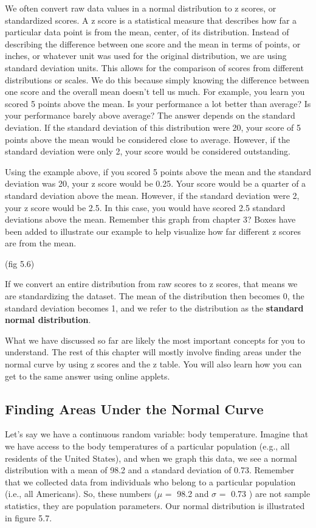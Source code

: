 \documentclass[
  letterpaper,
  DIV=11,
  numbers=noendperiod]{scrreprt}
\begin{document}
We often convert raw data values in a normal distribution to z scores,
or standardized scores. A z score is a statistical measure that
describes how far a particular data point is from the mean, center, of
its distribution. Instead of describing the difference between one score
and the mean in terms of points, or inches, or whatever unit was used
for the original distribution, we are using standard deviation units.
This allows for the comparison of scores from different distributions or
scales. We do this because simply knowing the difference between one
score and the overall mean doesn't tell us much. For example, you learn
you scored 5 points above the mean. Is your performance a lot better
than average? Is your performance barely above average? The answer
depends on the standard deviation. If the standard deviation of this
distribution were 20, your score of 5 points above the mean would be
considered close to average. However, if the standard deviation were
only 2, your score would be considered outstanding.

Using the example above, if you scored 5 points above the mean and the
standard deviation was 20, your z score would be 0.25. Your score would
be a quarter of a standard deviation above the mean. However, if the
standard deviation were 2, your z score would be 2.5. In this case, you
would have scored 2.5 standard deviations above the mean. Remember this
graph from chapter 3? Boxes have been added to illustrate our example to
help visualize how far different z scores are from the mean.

(fig 5.6)

If we convert an entire distribution from raw scores to z scores, that
means we are standardizing the dataset. The mean of the distribution
then becomes 0, the standard deviation becomes 1, and we refer to the
distribution as the \textbf{standard normal distribution}.

What we have discussed so far are likely the most important concepts for
you to understand. The rest of this chapter will mostly involve finding
areas under the normal curve by using z scores and the z table. You will
also learn how you can get to the same answer using online applets.

\subsection{Finding Areas Under the Normal
Curve}\label{finding-areas-under-the-normal-curve}

Let's say we have a continuous random variable: body temperature.
Imagine that we have access to the body temperatures of a particular
population (e.g., all residents of the United States), and when we graph
this data, we see a normal distribution with a mean of 98.2 and a
standard deviation of 0.73. Remember that we collected data from
individuals who belong to a particular population (i.e., all Americans).
So, these numbers (\(\mu\) =  98.2 and \(\sigma\) =  0.73 ) are not
sample statistics, they are population parameters. Our normal
distribution is illustrated in figure 5.7.
\end{document}
